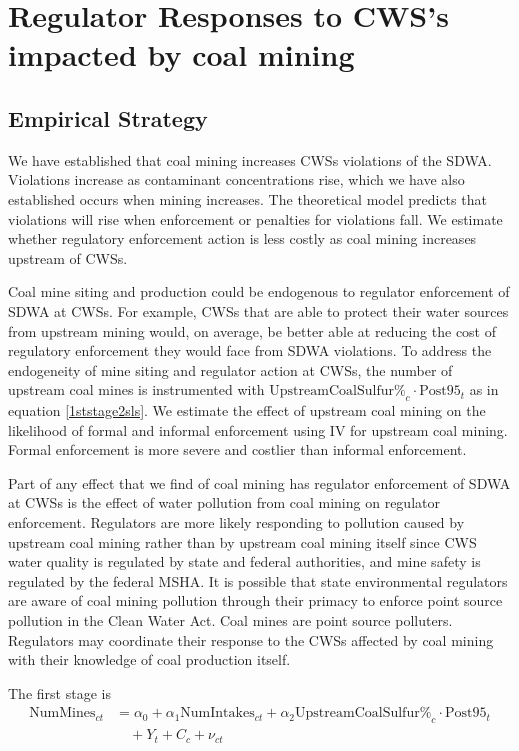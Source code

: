 \documentclass{article}
\begin{document}
\section{Regulator Responses to CWS's impacted by coal mining}

\subsection{Empirical Strategy}

We have established that coal mining increases CWSs violations of the SDWA. Violations increase as contaminant concentrations rise, which we have also established occurs when mining increases. The theoretical model predicts that violations will rise when enforcement or penalties for violations fall. We estimate whether regulatory enforcement action is less costly as coal mining increases upstream of CWSs. 

Coal mine siting and production could be endogenous to regulator enforcement of SDWA at CWSs. For example, CWSs that are able to protect their water sources from upstream mining would, on average, be better able at reducing the cost of regulatory enforcement they would face from SDWA violations. To address the endogeneity of mine siting and regulator action at CWSs, the number of upstream coal mines is instrumented with $\text{UpstreamCoalSulfur\%}_c \cdot \text{Post95}_t$ as in equation \ref{1ststage2sls}. We estimate the effect of upstream coal mining on the likelihood of formal and informal enforcement using IV for upstream coal mining. Formal enforcement is more severe and costlier than informal enforcement. 

Part of any effect that we find of coal mining has regulator enforcement of SDWA at CWSs is the effect of water pollution from coal mining on regulator enforcement. Regulators are more likely responding to pollution caused by upstream coal mining rather than by upstream coal mining itself since CWS water quality is regulated by state and federal authorities, and mine safety is regulated by the federal MSHA. It is possible that state environmental regulators are aware of coal mining pollution through their primacy to enforce point source pollution in the Clean Water Act. Coal mines are point source polluters. Regulators may coordinate their response to the CWSs affected by coal mining with their knowledge of coal production itself.

The first stage is
\begin{equation}\label{1ststage2slsreg}
\begin{split}
\text{NumMines}_{ct} &= \alpha_0 + \alpha_1\text{NumIntakes}_{ct} + \alpha_2\text{UpstreamCoalSulfur\%}_c \cdot \text{Post95}_t \\
&\quad + Y_t + C_c + \nu_{ct}
\end{split}
\end{equation}
\end{document}
